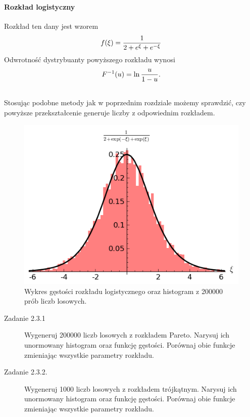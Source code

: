 \documentclass[a4paper,12pt,polish]{sphinxmanual}
\begin{document}
\paragraph{Rozkład logistyczny}
\label{ch5/chV011:rozklad-logistyczny}
Rozkład ten dany jest wzorem
\begin{gather}
\begin{split}f(\xi) = \frac{1}{2 + e^{\xi} + e^{-\xi}}\end{split}\notag
\end{gather}
Odwrotność dystrybuanty powyższego rozkładu wynosi
\begin{gather}
\begin{split}F^{-1}(u) = \ln\frac{u}{1-u}.\end{split}\notag\\\begin{split}\end{split}\notag
\end{gather}
Stosując podobne metody jak w poprzednim rozdziale możemy sprawdzić, czy powyższe przekształcenie
generuje liczby z odpowiednim rozkładem.
\begin{figure}[htbp]
\centering
\capstart

\includegraphics{r_logist_hist.png}
\caption{Wykres gęstości rozkładu logistycznego oraz histogram z 200000 prób liczb losowych.}\end{figure}
\begin{description}
\item[{Zadanie 2.3.1}] \leavevmode
Wygeneruj 200000 liczb losowych z rozkładem Pareto. Narysuj ich unormowany histogram oraz funkcję gęstości.
Porównaj obie funkcje zmieniając wszystkie parametry rozkładu.

\item[{Zadanie 2.3.2.}] \leavevmode
Wygeneruj 1000 liczb losowych z rozkładem trójkątnym. Narysuj ich unormowany histogram oraz funkcję gęstości.
Porównaj obie funkcje zmieniając wszystkie parametry rozkładu.

\end{description}
\end{document}
